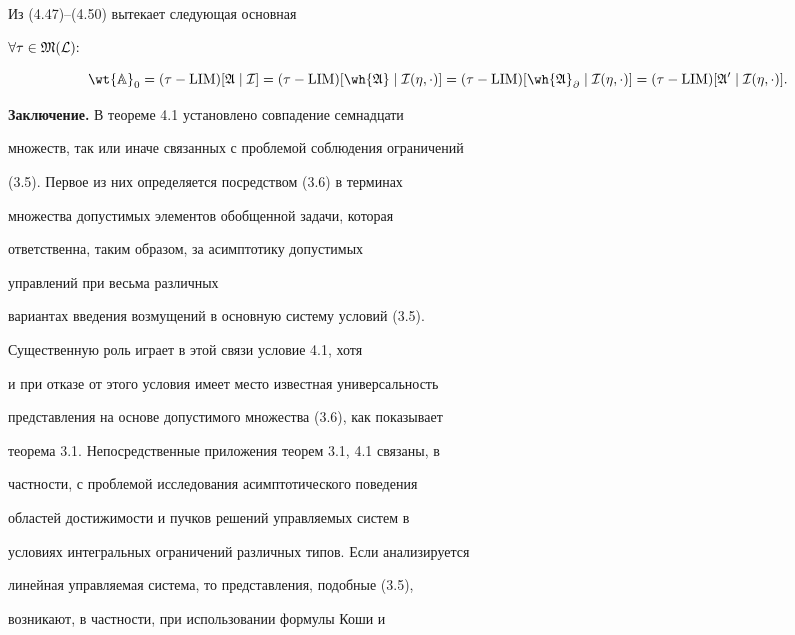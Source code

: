 Из (4.47)--(4.50) вытекает следующая основная





\begin{thms}


$\forall\tau\in\frak M(\cal L){:}$


$$


\wt{\Bbb A}_0=(\tau-\LIM)[\frak A\mid\cal I]=


(\tau-\LIM)[\wh{\frak A}\mid\cal I(\eta,\cdot)]=


(\tau-\LIM)[\wh{\frak A}_\partial\mid


\cal I(\eta,\cdot)]=(\tau-\LIM)[\frak A^0\mid\cal I(\eta,\cdot)].


$$


\end{thms}





{\bf Заключение.} В теореме 4.1 установлено совпадение семнадцати


множеств, так или иначе связанных с проблемой соблюдения ограничений


(3.5). Первое из них определяется посредством (3.6) в терминах


множества допустимых элементов обобщенной задачи, которая


ответственна, таким образом, за асимптотику допустимых


управлений при весьма различных


вариантах введения возмущений в основную систему условий (3.5).


Существенную роль играет в этой связи условие 4.1, хотя


и при отказе от этого условия имеет место известная универсальность


представления на основе допустимого множества (3.6), как показывает


теорема 3.1. Непосредственные приложения теорем 3.1, 4.1 связаны, в


частности, с проблемой исследования асимптотического поведения


областей достижимости и пучков решений управляемых систем в


условиях интегральных ограничений различных типов. Если анализируется


линейная управляемая система, то представления, подобные (3.5),


возникают, в частности, при использовании формулы Коши и


